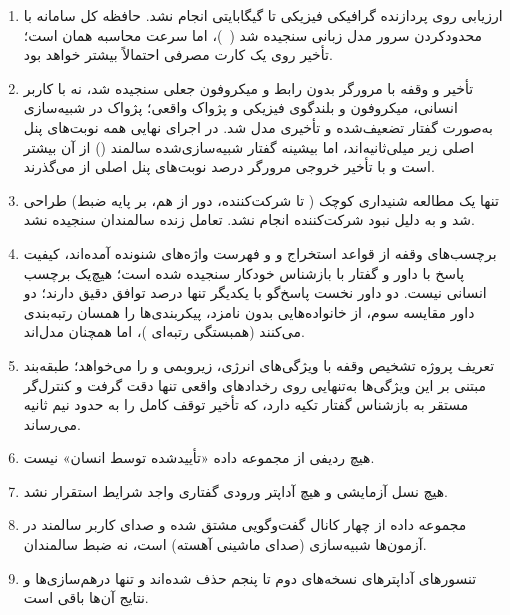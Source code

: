 \begin{enumerate}
\item {} ارزیابی روی پردازنده گرافیکی فیزیکی  تا
       گیگابایتی انجام نشد. حافظه کل سامانه با محدودکردن سرور مدل زبانی
      سنجیده شد (~)، اما سرعت محاسبه همان  است؛ تأخیر
      روی یک کارت مصرفی احتمالاً بیشتر خواهد بود.

\item {} تأخیر و وقفه با مرورگر بدون رابط و میکروفون
      جعلی سنجیده شد، نه با کاربر انسانی، میکروفون و بلندگوی فیزیکی و پژواک
      واقعی؛ پژواک در شبیه‌سازی به‌صورت گفتار تضعیف‌شده و تأخیری مدل شد.
      در اجرای نهایی همه نوبت‌های پنل اصلی زیر  میلی‌ثانیه‌اند، اما بیشینه
      گفتار شبیه‌سازی‌شده سالمند () از آن بیشتر است و با تأخیر خروجی
      مرورگر  درصد نوبت‌های پنل اصلی از  می‌گذرند.

\item {} تنها یک مطالعه شنیداری کوچک ( تا 
      شرکت‌کننده، دور از هم، بر پایه ضبط) طراحی شد و به دلیل نبود
      شرکت‌کننده انجام نشد. تعامل زنده سالمندان سنجیده نشد.

\item {} برچسب‌های وقفه از قواعد استخراج و
       و فهرست واژه‌های شنونده آمده‌اند، کیفیت پاسخ با داور
       و گفتار با بازشناس خودکار سنجیده شده است؛ هیچ‌یک برچسب انسانی
      نیست. دو داور نخست پاسخ‌گو با یکدیگر تنها  درصد توافق دقیق دارند؛
      دو داور مقایسه سوم، از خانواده‌هایی بدون نامزد، پیکربندی‌ها را همسان
      رتبه‌بندی می‌کنند (همبستگی رتبه‌ای )، اما همچنان مدل‌اند.

\item {} تعریف پروژه تشخیص وقفه با ویژگی‌های انرژی،
      زیر‌و‌بمی و  را می‌خواهد؛ طبقه‌بند مبتنی بر این ویژگی‌ها به‌تنهایی
      روی رخدادهای واقعی تنها  دقت گرفت و کنترل‌گر مستقر به بازشناس
      گفتار تکیه دارد، که تأخیر توقف کامل را به حدود نیم ثانیه می‌رساند.

\item {} هیچ ردیفی از مجموعه داده «تأییدشده توسط
      انسان» نیست.

\item {} هیچ نسل آزمایشی  و هیچ آداپتر ورودی گفتاری
       واجد شرایط استقرار نشد.

\item {} مجموعه داده از چهار کانال گفت‌وگویی مشتق شده و صدای
      کاربر سالمند در آزمون‌ها شبیه‌سازی (صدای ماشینی آهسته) است، نه ضبط
      سالمندان.

\item {} تنسورهای آداپترهای نسخه‌های دوم تا پنجم حذف
      شده‌اند و تنها درهم‌سازی‌ها و نتایج آن‌ها باقی است.
\end{enumerate}


